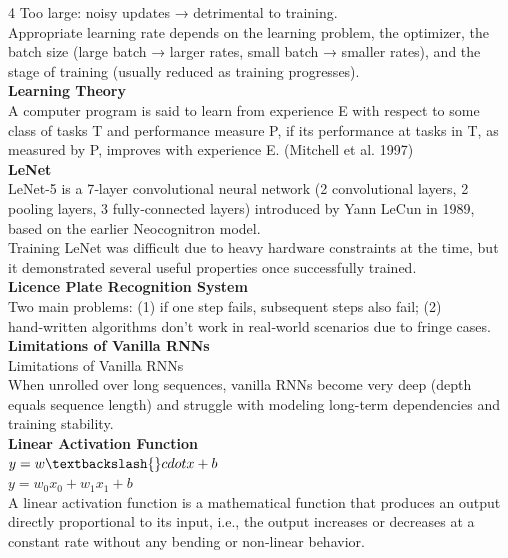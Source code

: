 \documentclass[8pt]{extarticle}
\begin{document}
\begin{multicols}{4}
Too large: noisy updates → detrimental to training.\\
Appropriate learning rate depends on the learning problem, the optimizer, the batch size (large batch → larger rates, small batch → smaller rates), and the stage of training (usually reduced as training progresses).\\
\vspace{2pt}\textbf{Learning Theory}\\
A computer program is said to learn from experience E with respect to some class of tasks T and performance measure P, if its performance at tasks in T, as measured by P, improves with experience E. (Mitchell et al. 1997)\\
\vspace{2pt}\textbf{LeNet}\\
LeNet-5 is a 7‑layer convolutional neural network (2 convolutional layers, 2 pooling layers, 3 fully‑connected layers) introduced by Yann LeCun in 1989, based on the earlier Neocognitron model.\\
Training LeNet was difficult due to heavy hardware constraints at the time, but it demonstrated several useful properties once successfully trained.\\
\vspace{2pt}\textbf{Licence Plate Recognition System}\\
Two main problems: (1) if one step fails, subsequent steps also fail; (2) hand‑written algorithms don’t work in real‑world scenarios due to fringe cases.\\
\vspace{2pt}\textbf{Limitations of Vanilla RNNs}\\
Limitations of Vanilla RNNs\\
When unrolled over long sequences, vanilla RNNs become very deep (depth equals sequence length) and struggle with modeling long-term dependencies and training stability.\\
\vspace{2pt}\textbf{Linear Activation Function}\\
$y = w \textbackslash\{\}cdot x + b$\\
$y = w_0 x_0 + w_1 x_1 + b$\\
A linear activation function is a mathematical function that produces an output directly proportional to its input, i.e., the output increases or decreases at a constant rate without any bending or non‑linear behavior.\\


\end{multicols}
\end{document}
